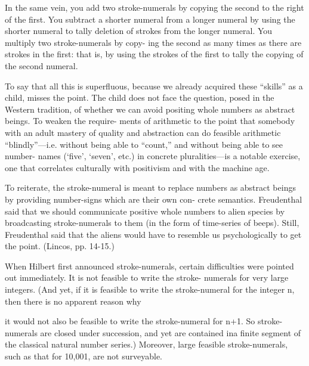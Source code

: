 In the same vein, you add two stroke-numerals by copying the 
second to the right of the first. You subtract a shorter numeral from a 
longer numeral by using the shorter numeral to tally deletion of strokes 
from the longer numeral. You multiply two stroke-numerals by copy- 
ing the second as many times as there are strokes in the first: that is, by 
using the strokes of the first to tally the copying of the second numeral. 

To say that all this is superfluous, because we already acquired 
these “skills” as a child, misses the point. The child does not face the 
question, posed in the Western tradition, of whether we can avoid 
positing whole numbers as abstract beings. To weaken the require- 
ments of arithmetic to the point that somebody with an adult mastery 
of quality and abstraction can do feasible arithmetic “blindly”—i.e. 
without being able to “count,” and without being able to see number- 
names (‘five’, ‘seven’, etc.) in concrete pluralities—is a notable exercise, 
one that correlates culturally with positivism and with the machine age. 

To reiterate, the stroke-numeral is meant to replace numbers as 
abstract beings by providing number-signs which are their own con- 
crete semantics. Freudenthal said that we should communicate positive 
whole numbers to alien species by broadcasting stroke-numerals to 
them (in the form of time-series of beeps). Still, Freudenthal said that 
the aliens would have to resemble us psychologically to get the point. 
(Lincos, pp. 14-15.) 

When Hilbert first announced stroke-numerals, certain difficulties 
were pointed out immediately. It is not feasible to write the stroke- 
numerals for very large integers. (And yet, if it is feasible to write the 
stroke-numeral for the integer n, then there is no apparent reason why 


it would not also be feasible to write the stroke-numeral for n+1. So 
stroke-numerals are closed under succession, and yet are contained ina 
finite segment of the classical natural number series.) Moreover, large 
feasible stroke-numerals, such as that for 10,001, are not surveyable. 

